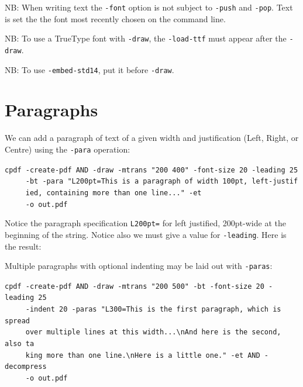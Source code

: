 \documentclass{book}
\begin{document}
NB: When writing text the \texttt{-font} option is not subject to \texttt{-push} and \texttt{-pop}. Text is set the the font most recently chosen on the command line.

NB: To use a TrueType font with \texttt{-draw}, the \texttt{-load-ttf} must appear after the \texttt{-draw}.

NB: To use \texttt{-embed-std14}, put it before \texttt{-draw}.

\section{Paragraphs}

We can add a paragraph of text of a given width and justification (Left, Right, or Centre) using the \texttt{-para} operation:

\begin{framed}
 \noindent\small\verb?cpdf -create-pdf AND -draw -mtrans "200 400" -font-size 20 -leading 25?\\
 \noindent\small\verb?     -bt -para "L200pt=This is a paragraph of width 100pt, left-justif?\\
 \noindent\small\verb?     ied, containing more than one line..." -et?\\
 \noindent\small\verb?     -o out.pdf?
\end{framed}

\noindent Notice the paragraph specification \texttt{L200pt=} for left justified, 200pt-wide at the beginning of the string. Notice also we must give a value for \texttt{-leading}. Here is the result:

\bigskip
{}
\bigskip

\noindent Multiple paragraphs with optional indenting may be laid out with \texttt{-paras}:

\begin{framed}
 \noindent\small\verb?cpdf -create-pdf AND -draw -mtrans "200 500" -bt -font-size 20 -leading 25?\\
 \noindent\small\verb?     -indent 20 -paras "L300=This is the first paragraph, which is spread ?\\
 \noindent\small\verb?     over multiple lines at this width...\nAnd here is the second, also ta?\\
 \noindent\small\verb?     king more than one line.\nHere is a little one." -et AND -decompress?\\
 \noindent\small\verb?     -o out.pdf?
\end{framed}
\end{document}
